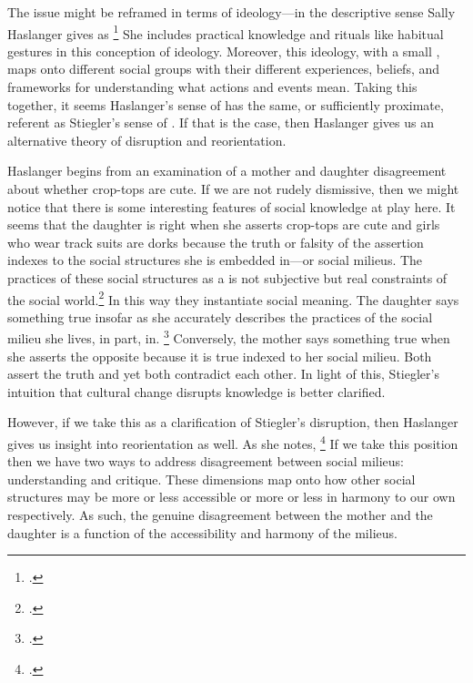 \documentclass[letterpaper,notitlepage,12pt]{article}
\begin{document}
The issue might be reframed in terms of ideology---in the descriptive sense
Sally Haslanger gives as \footcite[p. 75]{haslanger_but_2007}
She includes practical knowledge and rituals like habitual gestures in this
conception of ideology.
Moreover, this ideology, with a small , maps onto different social
groups with their different experiences, beliefs, and frameworks for
understanding what actions and events mean.
Taking this together, it seems Haslanger's sense of  has the 
same, or sufficiently proximate, referent as Stiegler's sense of
.
If that is the case, then Haslanger gives us an alternative theory of disruption
and reorientation.

Haslanger begins from an examination of a mother and daughter disagreement about
whether crop-tops are cute.
If we are not rudely dismissive, then we might notice that there is some
interesting features of social knowledge at play here.
It seems that the daughter is right when she asserts crop-tops are cute and
girls who wear track suits are dorks because the truth or falsity of the
assertion indexes to the social structures she is embedded in---or social
milieus.
The practices of these social structures as a  is not subjective but real constraints of the social 
world.\footcite[p. 79]{haslanger_but_2007}
In this way they instantiate social meaning.
The daughter says something true insofar as she accurately describes the
practices of the social milieu she lives, in part, in.
\footcite[p. 81]{haslanger_but_2007}
Conversely, the mother says something true when she asserts the opposite because
it is true indexed to her social milieu.
Both assert the truth and yet both contradict each other.
In light of this, Stiegler's intuition that cultural change disrupts knowledge
is better clarified.

However, if we take this as a clarification of Stiegler's disruption, then
Haslanger gives us insight into reorientation as well.
As she notes, \footcite[p. 81]{haslanger_but_2007}
If we take this position then we have two ways to address disagreement between
social milieus: understanding and critique. These dimensions map onto how other
social structures may be more or less accessible or more or less in harmony to
our own respectively. As such, the genuine disagreement between the mother and
the daughter is a function of the accessibility and harmony of the milieus.
\end{document}
